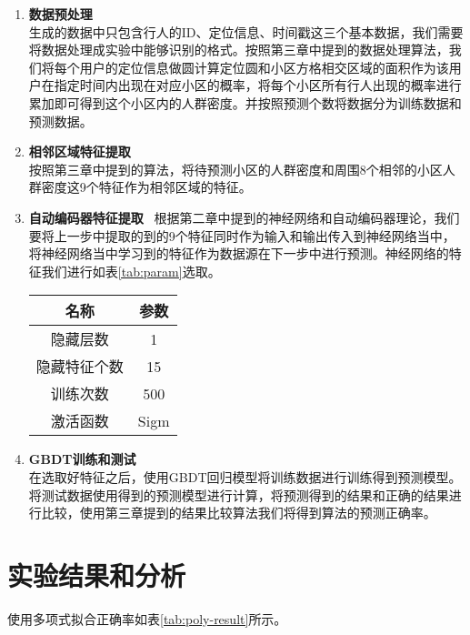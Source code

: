 \begin{enumerate}
    \item \textbf{数据预处理} \\
    生成的数据中只包含行人的ID、定位信息、时间戳这三个基本数据，我们需要将数据处理成实验中能够识别的格式。按照第三章中提到的数据处理算法，我们将每个用户的定位信息做圆计算定位圆和小区方格相交区域的面积作为该用户在指定时间内出现在对应小区的概率，将每个小区所有行人出现的概率进行累加即可得到这个小区内的人群密度。并按照预测个数将数据分为训练数据和预测数据。
    \item \textbf{相邻区域特征提取} \\
    按照第三章中提到的算法，将待预测小区的人群密度和周围8个相邻的小区人群密度这9个特征作为相邻区域的特征。
    \item \textbf{自动编码器特征提取} \
    根据第二章中提到的神经网络和自动编码器理论，我们要将上一步中提取的到的9个特征同时作为输入和输出传入到神经网络当中，将神经网络当中学习到的特征作为数据源在下一步中进行预测。神经网络的特征我们进行如表\ref{tab:param}选取。   
    \begin{table}[!hpb]
        \centering
        \begin{tabular}{@{}cc@{}} \toprule
            名称 & 参数 \\ \midrule
            隐藏层数 & 1 \\
            隐藏特征个数 & 15 \\
            训练次数 & 500 \\
            激活函数 & Sigm \\ \bottomrule
        \end{tabular}
    \end{table}
    \item \textbf{GBDT训练和测试} \\
    在选取好特征之后，使用GBDT回归模型将训练数据进行训练得到预测模型。将测试数据使用得到的预测模型进行计算，将预测得到的结果和正确的结果进行比较，使用第三章提到的结果比较算法我们将得到算法的预测正确率。
\end{enumerate}

\section{实验结果和分析}

使用多项式拟合正确率如表\ref{tab:poly-result}所示。

